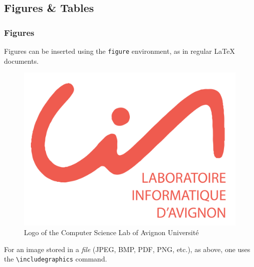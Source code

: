 \documentclass[10pt,    %
    english,            %
    xcolor=table,       %
    envcountsect,       %
    aspectratio=43      %
]{beamer}
\begin{document}
\subsection{Figures \& Tables}
\begin{frame}
    \frametitle{Figures}
    
    Figures can be inserted using the \texttt{figure} environment, as in regular \LaTeX{} documents.
    
    \begin{figure}[H]
        \centering
        \includegraphics[scale=0.05]{images/lia_logo.pdf}
        \vspace{-0.5cm}
        \caption{Logo of the Computer Science Lab of Avignon Université}
        \label{fig:LIAlogo}
    \end{figure}
    
    \vspace{0.25cm}
    For an image stored in a \textit{file} (JPEG, BMP, PDF, PNG, etc.), as above, one uses the \texttt{\textbackslash{}includegraphics} command.
    

\end{frame}
\end{document}
